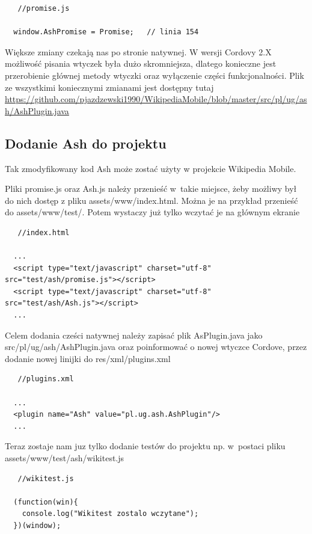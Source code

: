 \documentclass[brudnopis]{xmgr}
\begin{document}
\begin{lstlisting}
   //promise.js
  
  window.AshPromise = Promise;   // linia 154

\end{lstlisting}

Większe zmiany czekają nas po stronie natywnej. W wersji Cordovy 2.X możliwość pisania wtyczek była dużo skromniejsza, dlatego konieczne jest przerobienie głównej metody wtyczki oraz wyłączenie części funkcjonalności. Plik ze wszystkimi koniecznymi zmianami jest dostępny tutaj \url{https://github.com/pjazdzewski1990/WikipediaMobile/blob/master/src/pl/ug/ash/AshPlugin.java}

\subsection{Dodanie Ash do projektu}

Tak zmodyfikowany kod Ash może zostać użyty w projekcie Wikipedia Mobile.

Pliki promise.js oraz Ash.js należy przenieść w~takie miejsce, żeby możliwy był do nich dostęp z pliku assets/www/index.html. Można je na przykład przenieść do assets/www/test/. Potem wystaczy już tylko wczytać je na głównym ekranie 

\begin{lstlisting}
   //index.html
  
  ...
  <script type="text/javascript" charset="utf-8" src="test/ash/promise.js"></script>
  <script type="text/javascript" charset="utf-8" src="test/ash/Ash.js"></script>
  ...

\end{lstlisting}

Celem dodania cześci natywnej należy zapisać plik AsPlugin.java jako src/pl/ug/ash/AshPlugin.java oraz poinformować o nowej wtyczce Cordove, przez dodanie nowej linijki do res/xml/plugins.xml

\begin{lstlisting}
   //plugins.xml
  
  ...
  <plugin name="Ash" value="pl.ug.ash.AshPlugin"/>
  ...

\end{lstlisting}

Teraz zostaje nam juz tylko dodanie testów do projektu np. w~postaci pliku  assets/www/test/ash/wikitest.js 

\begin{lstlisting}
   //wikitest.js

  (function(win){  
    console.log("Wikitest zostalo wczytane");
  })(window);
\end{lstlisting}
\end{document}
